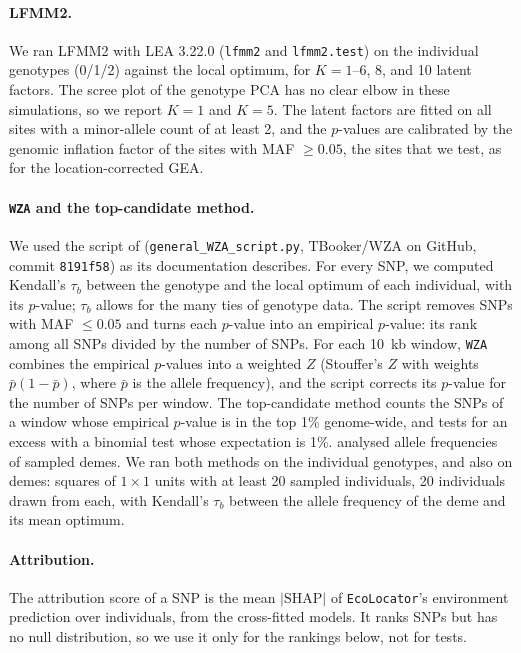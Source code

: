 \documentclass[]{article}
\newcommand{\ecolocator}{\texttt{EcoLocator}\xspace}
\begin{document}
\paragraph{LFMM2.}
We ran LFMM2 with LEA 3.22.0 \citep{frichot_lea_2015}
(\texttt{lfmm2} and \texttt{lfmm2.test})
on the individual genotypes (0/1/2) against the local optimum,
for $K = 1$--6, 8, and 10 latent factors.
The scree plot of the genotype PCA has no clear elbow in these simulations,
so we report $K = 1$ and $K = 5$.
The latent factors are fitted on all sites
with a minor-allele count of at least 2,
and the $p$-values are calibrated by the genomic inflation factor
of the sites with MAF $\geq 0.05$, the sites that we test,
as for the location-corrected GEA.

\paragraph{\texttt{WZA} and the top-candidate method.}
We used the script of \citet{booker_wza_2024}
(\texttt{general\_\allowbreak WZA\_\allowbreak script.py},
TBooker/WZA on GitHub, commit \texttt{8191f58})
as its documentation describes.
For every SNP, we computed Kendall's $\tau_b$
between the genotype and the local optimum of each individual,
with its $p$-value;
$\tau_b$ allows for the many ties of genotype data.
The script removes SNPs with MAF $\leq 0.05$
and turns each $p$-value into an empirical $p$-value:
its rank among all SNPs divided by the number of SNPs.
For each 10~kb window,
\texttt{WZA} combines the empirical $p$-values into a weighted $Z$
(Stouffer's $Z$ with weights $\bar{p}(1 - \bar{p})$,
where $\bar{p}$ is the allele frequency),
and the script corrects its $p$-value for the number of SNPs per window.
The top-candidate method counts the SNPs of a window
whose empirical $p$-value is in the top 1\% genome-wide,
and tests for an excess with a binomial test whose expectation is 1\%.
\citet{booker_wza_2024} analysed allele frequencies of sampled demes.
We ran both methods on the individual genotypes,
and also on demes:
squares of $1 \times 1$ units with at least 20 sampled individuals,
20 individuals drawn from each,
with Kendall's $\tau_b$ between the allele frequency of the deme
and its mean optimum.

\paragraph{Attribution.}
The attribution score of a SNP is the mean $|\mathrm{SHAP}|$
of \ecolocator's environment prediction over individuals,
from the cross-fitted models.
It ranks SNPs but has no null distribution,
so we use it only for the rankings below, not for tests.
\end{document}
